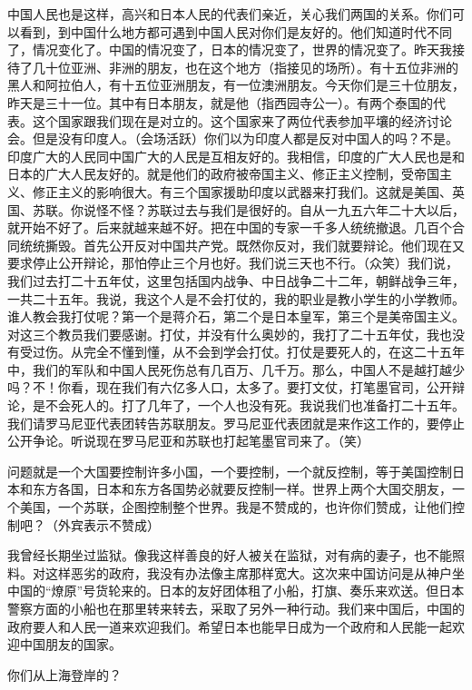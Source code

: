 中国人民也是这样，高兴和日本人民的代表们亲近，关心我们两国的关系。你们可以看到，到中国什么地方都可遇到中国人民对你们是友好的。他们知道时代不同了，情况变化了。中国的情况变了，日本的情况变了，世界的情况变了。昨天我接待了几十位亚洲、非洲的朋友，也在这个地方（指接见的场所）。有十五位非洲的黑人和阿拉伯人，有十五位亚洲朋友，有一位澳洲朋友。今天你们是三十位朋友，昨天是三十一位。其中有日本朋友，就是他（指西园寺公一）。有两个泰国的代表。这个国家跟我们现在是对立的。这个国家来了两位代表参加平壤的经济讨论会。但是没有印度人。（会场活跃）你们以为印度人都是反对中国人的吗？不是。印度广大的人民同中国广大的人民是互相友好的。我相信，印度的广大人民也是和日本的广大人民友好的。就是他们的政府被帝国主义、修正主义控制，受帝国主义、修正主义的影响很大。有三个国家援助印度以武器来打我们。这就是美国、英国、苏联。你说怪不怪？苏联过去与我们是很好的。自从一九五六年二十大以后，就开始不好了。后来就越来越不好。把在中国的专家一千多人统统撤退。几百个合同统统撕毁。首先公开反对中国共产党。既然你反对，我们就要辩论。他们现在又要求停止公开辩论，那怕停止三个月也好。我们说三天也不行。（众笑）我们说，我们过去打二十五年仗，这里包括国内战争、中日战争二十二年，朝鲜战争三年，一共二十五年。我说，我这个人是不会打仗的，我的职业是教小学生的小学教师。谁人教会我打仗呢？第一个是蒋介石，第二个是日本皇军，第三个是美帝国主义。对这三个教员我们要感谢。打仗，并没有什么奥妙的，我打了二十五年仗，我也没有受过伤。从完全不懂到懂，从不会到学会打仗。打仗是要死人的，在这二十五年中，我们的军队和中国人民死伤总有几百万、几千万。那么，中国人不是越打越少吗？不！你看，现在我们有六亿多人口，太多了。要打文仗，打笔墨官司，公开辩论，是不会死人的。打了几年了，一个人也没有死。我说我们也准备打二十五年。我们请罗马尼亚代表团转告苏联朋友。罗马尼亚代表团就是来作这工作的，要停止公开争论。听说现在罗马尼亚和苏联也打起笔墨官司来了。（笑）

问题就是一个大国要控制许多小国，一个要控制，一个就反控制，等于美国控制日本和东方各国，日本和东方各国势必就要反控制一样。世界上两个大国交朋友，一个美国，一个苏联，企图控制整个世界。我是不赞成的，也许你们赞成，让他们控制吧？（外宾表示不赞成）

我曾经长期坐过监狱。像我这样善良的好人被关在监狱，对有病的妻子，也不能照料。对这样恶劣的政府，我没有办法像主席那样宽大。这次来中国访问是从神户坐中国的“燎原”号货轮来的。日本的友好团体租了小船，打旗、奏乐来欢送。但日本警察方面的小船也在那里转来转去，采取了另外一种行动。我们来中国后，中国的政府要人和人民一道来欢迎我们。希望日本也能早日成为一个政府和人民能一起欢迎中国朋友的国家。

你们从上海登岸的？

